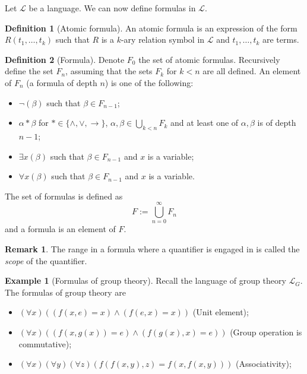 \documentclass[11pt,a4paper]{article}
\theoremstyle{definition}
\newtheorem{definition}{Definition}[section]
\newtheorem{remark}{Remark}[section]
\newtheorem{example}{Example}[section]
\theoremstyle{plain}
\renewcommand{\L}{\mathcal{L}}
\renewcommand{\implies}{\rightarrow}
\begin{document}
  Let $\L$ be a language. We can now define formulas in $\L$.

  \begin{definition}[Atomic formula]
    An atomic formula is an expression of the form $R(t_1,\dots,t_k)$ such
    that $R$ is a $k$-ary relation symbol in $\L$ and $t_1,\dots,t_k$ are
    terms.
  \end{definition}
  
  \begin{definition}[Formula]
    Denote $F_0$ the set of atomic formulas.
    Recursively define the set $F_n$, assuming that the sets $F_k$ for $k < n$
    are all defined.
    An element of $F_n$ (a formula of depth $n$) is one of the following:
    \begin{itemize}
      \item $\neg (\beta)$ such that $\beta \in F_{n-1}$;
      \item $\alpha * \beta$ for $* \in \{\land, \lor, \implies\}$,
        $\alpha,\beta \in \bigcup_{k < n} F_k$ and at least one of 
        $\alpha,\beta$ is of depth $n-1$;
      \item $\exists x(\beta)$ such that $\beta \in F_{n-1}$ and $x$ is
        a variable;
      \item $\forall x(\beta)$ such that $\beta \in F_{n-1}$ and $x$ is
        a variable.
    \end{itemize}
    The set of formulas is defined as
    \[
      F := \bigcup_{n=0}^{\infty} F_n
    \]
    and a formula is an element of $F$.
  \end{definition}

  \begin{remark}
    The range in a formula where a quantifier is engaged in is called the
    \emph{scope} of the quantifier.
  \end{remark}

  \begin{example}[Formulas of group theory]
    Recall the language of group theory $\L_G$.
    The formulas of group theory are
    \begin{itemize}
      \item $(\forall x)((f(x,e) = x) \land (f(e,x) = x))$ (Unit element);
      \item $(\forall x)((f(x,g(x)) = e) \land (f(g(x),x) = e))$
        (Group operation is commutative);
      \item $(\forall x)(\forall y)(\forall z)
        (f(f(x,y),z) = f(x,f(x,y)))$ (Associativity);
    \end{itemize}
  \end{example}
\end{document}
